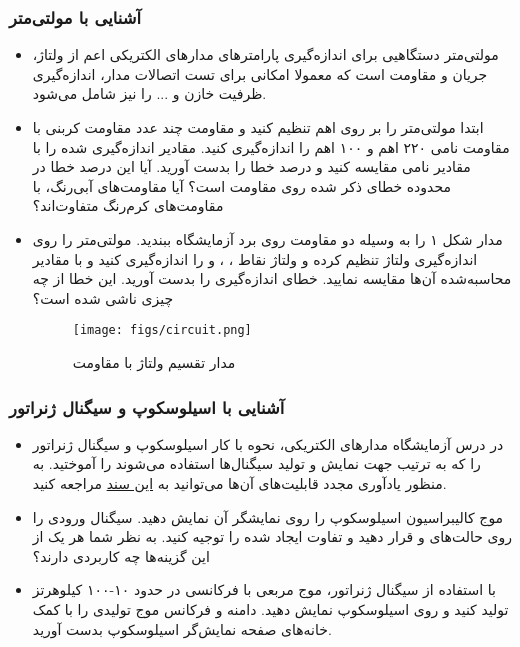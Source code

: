 \documentclass[12pt]{article}
\begin{document}
\subsubsection{آشنایی با مولتی‌متر}
\begin{itemize}
    \item مولتی‌متر دستگاهیی برای اندازه‌گیری پارامتر‌های مدار‌های الکتریکی اعم از ولتاژ، جریان و مقاومت است که معمولا امکانی برای تست اتصالات مدار، اندازه‌گیری ظرفیت خازن و ... را نیز شامل می‌شود.
    \item ابتدا مولتی‌متر را بر روی اهم تنظیم کنید و مقاومت چند عدد مقاومت کربنی با مقاومت نامی ۲۲۰ اهم و ۱۰۰ اهم را اندازه‌گیری کنید. مقادیر اندازه‌گیری شده را با مقادیر نامی مقایسه کنید و درصد خطا را بدست آورید. آیا این درصد خطا در محدوده خطای ذکر شده روی مقاومت است؟ آیا مقاومت‌های آبی‌رنگ، با مقاومت‌های کرم‌رنگ متفاوت‌اند؟
    \item مدار شکل ۱ را به وسیله دو مقاومت روی برد آزمایشگاه ببندید. مولتی‌متر را روی اندازه‌گیری ولتاژ تنظیم کرده و ولتاژ نقاط ، ، و  را اندازه‌گیری کنید و با مقادیر محاسبه‌شده آن‌ها مقایسه نمایید. خطای اندازه‌گیری را بدست آورید. این خطا از چه چیزی ناشی شده است؟
    \begin{figure}[!h]
        \centering
        \texttt{[image: figs/circuit.png]}
        \caption{مدار تقسیم ولتاژ با مقاومت}
        \label{fig:1}
    \end{figure}
\end{itemize}

\subsubsection{آشنایی با اسیلوسکوپ و سیگنال ژنراتور}
\begin{itemize}
    \item در درس آزمایشگاه مدار‌های الکتریکی، نحوه با کار اسیلوسکوپ و سیگنال ژنراتور را که به ترتیب جهت نمایش و تولید سیگنال‌ها استفاده می‌شوند را آموختید. به منظور یادآوری مجدد قابلیت‌های آن‌ها می‌توانید به \href{www.google.com}{این سند} مراجعه کنید.
    \item موج کالیبراسیون اسیلوسکوپ را روی نمایشگر آن نمایش دهید. سیگنال ورودی را روی حالت‌های  و  قرار دهید و تفاوت ایجاد شده را توجیه کنید. به نظر شما هر یک از این گزینه‌ها چه کاربردی دارند؟
    \item با استفاده از سیگنال ژنراتور، موج مربعی با فرکانسی در حدود ۱۰-۱۰۰ کیلوهرتز تولید کنید و روی اسیلوسکوپ نمایش دهید. دامنه و فرکانس موج تولیدی را با کمک خانه‌های صفحه نمایش‌گر اسیلوسکوپ بدست آورید.
\end{itemize}
\end{document}
